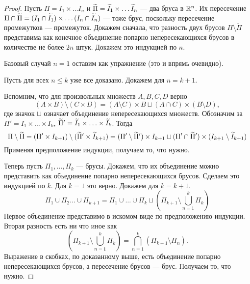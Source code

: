 	\begin{proof}
		Пусть $\Pi = I_1 \times \ldots I_n$ и $\widetilde{\Pi} = \widetilde{I}_1 \times \ldots \widetilde{I}_n$ --- два бруса в $\mathbb{R}^n$. Их пересечение $\Pi \cap \widetilde{\Pi} = (I_1 \cap \widetilde{I}_1) \times \ldots (I_n\cap \widetilde{I}_n)$ --- тоже брус, поскольку пересечение промежутков --- промежуток.
		Докажем сначала, что разность двух брусов $\Pi \setminus \widetilde{\Pi}$ представима как конечное объединение попарно непересекающихся брусов в количестве не более $2n$ штук. Докажем это индукцией по $n$.
		\par Базовый случай $n=1$ оставим как упражнение (это и впрямь очевидно).
		\par Пусть для всех $n \leqslant k$ уже все доказано. Докажем для $n = k + 1$. 
		\par Вспомним, что для произвольных множеств $A, B, C, D$ верно
		$$
			(A\times B) \setminus (C \times D) = (A \setminus C) \times B \sqcup (A\cap C)\times (B \setminus D),
		$$
		где значок $\sqcup$ означает объединение непересекающихся множеств.
		Обозначим за $\Pi' = I_1 \times \ldots \times I_k$, $\widetilde{\Pi}' = \widetilde{I}_1 \times \ldots \times \widetilde{I}_k$. Тогда
		$$
			\Pi \setminus \widetilde{\Pi} = (\Pi' \times I_{k+1}) \setminus (\widetilde{\Pi}' \times \widetilde{I}_{k + 1}) = (\Pi' \setminus \widetilde{\Pi}')\times I_{k + 1} \sqcup (\Pi' \cap \widetilde{\Pi}')\times (I_{k + 1} \setminus \widetilde{I}_{k + 1})
		$$
		Применяя предположение индукции, получаем то, что нужно.
		\par Теперь пусть $\Pi_1, \ldots, \Pi_k$ --- брусы. Докажем, что их объединение можно представить как объединение попарно непересекающихся брусов. Сделаем это индукцией по $k$. Для $k = 1$ это верно. Докажем для $k = k + 1$.
		$$
			\Pi_1 \cup \Pi_2 \ldots \cup \Pi_{k + 1} = \Pi_1 \cup \ldots \cup \Pi_{k} \sqcup \left(\Pi_{k + 1} \setminus \bigcup\limits_{n =1}^k\Pi_k\right)
		$$
		Первое объединение представимо в искомом виде по предположению индукции. Вторая разность есть ни что иное как
		$$
			\left(\Pi_{k + 1} \setminus \bigcup\limits_{n =1}^k\Pi_k\right) = \bigcap\limits_{n=1}^{k}(\Pi_{k + 1} \setminus \Pi_n).
		$$
		Выражение в скобках, по доказанному выше, есть объединение попарно непересекающихся брусов, а пересечение брусов --- брус. Получаем то, что нужно.
	\end{proof}